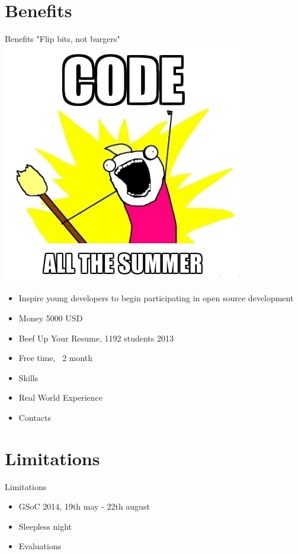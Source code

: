 \documentclass[11pt]{beamer}
\begin{document}
\section{Benefits}
\begin{frame}{Benefits}
	"Flip bits, not burgers"
		\hbox{ 
     		\hspace*{4cm}
		\includegraphics[scale=0.26]{images/code.png}	
		}
	\begin{itemize}
		\item Inspire young developers to begin participating in open source development
		\item Money 5000 USD
		\item Beef Up Your Resume, 1192 students 2013
		\item Free time, ~2 month
		\item Skills
		\item Real World Experience
		\item Contacts
	\end{itemize}
\end{frame}
	

\section{Limitations}
\begin{frame}{Limitations}
	\begin{itemize}
		\item GSoC 2014, 19th may - 22th august
		\item Sleepless night
		\item Evaluations
	\end{itemize}
\end{frame}
\end{document}
